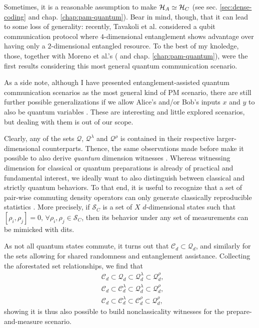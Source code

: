             Sometimes, it is a reasonable assumption to make $\mathcal{H}_A \simeq \mathcal{H}_C$ (see sec. \ref{sec:dense-coding} and chap. \ref{chap:pam-quantum}). Bear in mind, though, that it can lead to some loss of generality: recently, Tavakoli et al. \cite{tavakoli_eapam_2021} considered a qubit communication protocol where $4$-dimensional entanglement shows advantage over having only a $2$-dimensional entangled resource. To the best of my knoledge, those, together with Moreno et al.'s (\cite{moreno_pamdense_2021} and chap. \ref{chap:pam-quantum}), were the first results considering this most general quantum communication scenario.
            
            As a side note, although I have presented entanglement-assisted quantum communication scenarios as the most general kind of PM scenario, there are still further possible generalizations if we allow Alice's and/or Bob's inputs $x$ and $y$ to also be quantum variables \cite{guerini_distributed_2019}. These are interesting and little explored scenarios, but dealing with them is out of our scope.
            
            Clearly, any of the sets $\mathcal{Q}$, $\mathcal{Q}^\lambda$ and $\mathcal{Q}^\rho$ is contained in their respective larger-dimensional counterparts. Thence, the same observations made before make it possible to also derive \emph{quantum} dimension witnesses \cite{gallego_pam_2010}. Whereas witnessing dimension for classical or quantum preparations is already of practical and fundamental interest, we ideally want to also distinguish between classical and strictly quantum behaviors. To that end, it is useful to recognize that a set of pair-wise commuting density operators can only generate classically reproducible statistics \cite{dallarno_robustness_2012}. More precisely, if $\mathcal{S}_C$ is a set of $X$ $d$-dimensional states such that $\left[ \rho_i, \rho_j \right] = 0, \,\forall \rho_i, \rho_j \in \mathcal{S}_C$, then its behavior under any set of measurements can be mimicked with dits. 
            
            As not all quantum states commute, it turns out that $\mathcal{C}_d \subset \mathcal{Q}_d$, and similarly for the sets allowing for shared randomness and entanglement assistance. Collecting the aforestated set relationships, we find that 
            \begin{align}
                &\mathcal{C}_d \subset \mathcal{Q}_d \subset \mathcal{Q}_d^\lambda \subset \mathcal{Q}_d^\rho , \\
                &\mathcal{C}_d \subset \mathcal{C}_d^\lambda \subset \mathcal{Q}_d^\lambda \subset \mathcal{Q}_d^\rho, \\
                &\mathcal{C}_d \subset \mathcal{C}_d^\lambda \subset \mathcal{C}_d^\rho \subset \mathcal{Q}_d^\rho ,
            \end{align}
            showing it is thus also possible to build nonclassicality witnesses for the prepare-and-measure scenario.
            
